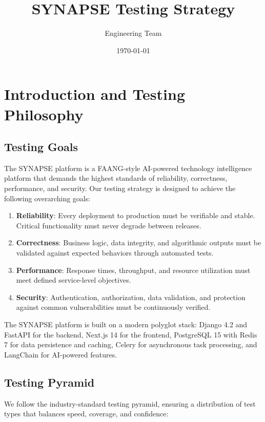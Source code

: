 \documentclass{report}
\title{SYNAPSE Testing Strategy}
\author{Engineering Team}
\date{\today}
\begin{document}
\maketitle

\tableofcontents

\chapter{Introduction and Testing Philosophy}

\section{Testing Goals}

The SYNAPSE platform is a FAANG-style AI-powered technology intelligence platform that demands the highest standards of reliability, correctness, performance, and security. Our testing strategy is designed to achieve the following overarching goals:

\begin{enumerate}
  \item \textbf{Reliability}: Every deployment to production must be verifiable and stable. Critical functionality must never degrade between releases.
  \item \textbf{Correctness}: Business logic, data integrity, and algorithmic outputs must be validated against expected behaviors through automated tests.
  \item \textbf{Performance}: Response times, throughput, and resource utilization must meet defined service-level objectives.
  \item \textbf{Security}: Authentication, authorization, data validation, and protection against common vulnerabilities must be continuously verified.
\end{enumerate}

The SYNAPSE platform is built on a modern polyglot stack: Django 4.2 and FastAPI for the backend, Next.js 14 for the frontend, PostgreSQL 15 with Redis 7 for data persistence and caching, Celery for asynchronous task processing, and LangChain for AI-powered features.

\section{Testing Pyramid}

We follow the industry-standard testing pyramid, ensuring a distribution of test types that balances speed, coverage, and confidence:
\end{document}
